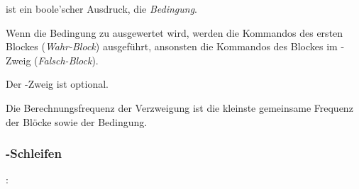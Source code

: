 \glq{}\grq ist ein boole'scher Ausdruck, die \emph{Bedingung}.

Wenn die Bedingung zu  ausgewertet wird, werden die Kommandos des ersten Blockes (\emph{Wahr-Block}) ausgeführt,
ansonsten die Kommandos des Blockes im -Zweig (\emph{Falsch-Block}).

Der -Zweig ist optional.

Die Berechnungsfrequenz der Verzweigung ist die kleinste gemeinsame Frequenz der Blöcke sowie der Bedingung.

\subsubsection{-Schleifen}\label{$_backslash$kw__for__-Schleifen}
:\label{schleife_for}\\
\hspace*{1cm}\Gspace\Gt{(}\Gspace\Gt{;}\Gspace\Gt{;}\Gspace\Gt{)}\Gspace\Gt{\{}\Gspace{} \Gspace\Gt{\}}\\
\hspace*{1cm}\Gspace\Gt{(}\Gspace\Gt{;}\Gspace\Gt{;}\Gspace{} \Gspace\Gt{)}\Gspace\Gt{\{}\Gspace{} \Gspace\Gt{\}}\\
\hspace*{1cm}\Gspace\Gt{(}\Gspace\Gt{;}\Gspace{} \Gspace\Gt{;}\Gspace\Gt{)}\Gspace\Gt{\{}\Gspace{} \Gspace\Gt{\}}\\
\hspace*{1cm}\Gspace\Gt{(}\Gspace\Gt{;}\Gspace{} \Gspace\Gt{;}\Gspace{} \Gspace\Gt{)}\Gspace\Gt{\{}\Gspace{} \Gspace\Gt{\}}\\
\hspace*{1cm}\Gspace\Gt{(}\Gspace{} \Gspace\Gt{;}\Gspace\Gt{;}\Gspace\Gt{)}\Gspace\Gt{\{}\Gspace{} \Gspace\Gt{\}}\\
\hspace*{1cm}\Gspace\Gt{(}\Gspace{} \Gspace\Gt{;}\Gspace\Gt{;}\Gspace{} \Gspace\Gt{)}\Gspace\Gt{\{}\Gspace{} \Gspace\Gt{\}}\\

